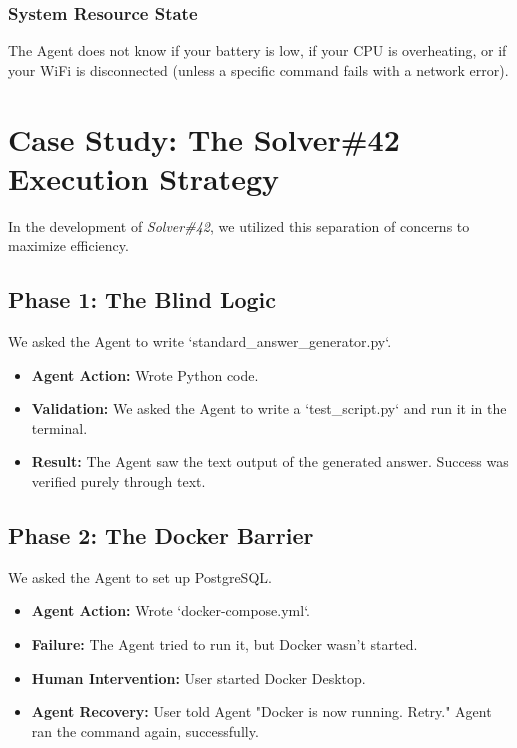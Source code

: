\documentclass[12pt, a4paper]{article}
\begin{document}
\subsubsection{System Resource State}
The Agent does not know if your battery is low, if your CPU is overheating, or if your WiFi is disconnected (unless a specific command fails with a network error).

\section{Case Study: The Solver\#42 Execution Strategy}

In the development of \textit{Solver\#42}, we utilized this separation of concerns to maximize efficiency.

\subsection{Phase 1: The Blind Logic}
We asked the Agent to write `standard_answer_generator.py`.
\begin{itemize}
    \item \textbf{Agent Action:} Wrote Python code.
    \item \textbf{Validation:} We asked the Agent to write a `test_script.py` and run it in the terminal.
    \item \textbf{Result:} The Agent saw the text output of the generated answer. Success was verified purely through text.
\end{itemize}

\subsection{Phase 2: The Docker Barrier}
We asked the Agent to set up PostgreSQL.
\begin{itemize}
    \item \textbf{Agent Action:} Wrote `docker-compose.yml`.
    \item \textbf{Failure:} The Agent tried to run it, but Docker wasn't started.
    \item \textbf{Human Intervention:} User started Docker Desktop.
    \item \textbf{Agent Recovery:} User told Agent "Docker is now running. Retry." Agent ran the command again, successfully.
\end{itemize}
\end{document}
